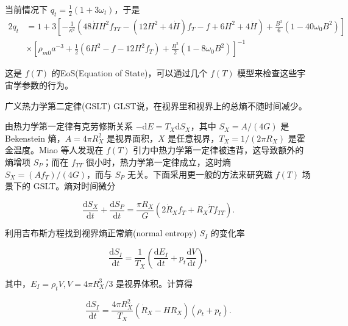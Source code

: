 \documentclass[9pt, dvipsnames]{beamer} %
\begin{document}
\begin{frame}
    当前情况下 $q_t=\frac{1}{2}(1+3\omega_t)$，于是
    $$
    \begin{aligned}
        2q_t
        &=1 + 3\left[-\frac{1 }{\kappa^2 } \left(48\dot{H} H^2 f_{TT} - \left(12 H^2 + 4\dot{H} \right) f_T - f + 6H^2 + 4\dot{H} \right) + \frac{B^2 }{6 } \left(1-40\omega_0 B^2 \right) \right] \\
        &\times \left[\rho_{m0}a^{-3} + \frac{1 }{2 } \left(6H^2-f-12H^2 f_T \right) + \frac{B^2 }{2 } \left(1-8\omega_0 B^2 \right) \right]^{-1}
    \end{aligned}
    $$

    这是 $f(T)$ 的EoS(Equation of State)，可以通过几个 $f(T)$ 模型来检查这些宇宙学参数的行为。
\end{frame}

\begin{frame}{广义热力学第二定律(GSLT)}
    GLST说，在视界里和视界上的总熵不随时间减少。

    由热力学第一定律有克劳修斯关系 $-\mathrm{d}E=T_X\mathrm{d}S_X$，其中 $S_X=A/(4G)$ 是 Bekenstein 熵，$A=4\pi R_X^2$ 是视界面积，$X$ 是任意视界，$T_X=1/(2\pi R_X)$ 是霍金温度。Miao 等人发现在 $f(T)$ 引力中热力学第一定律被违背，这导致额外的熵增项 $S_P$；而在 $f_{TT}$ 很小时，热力学第一定律成立，这时熵 $S_X=(Af_T)/(4G)$，而与 $S_P$ 无关。下面采用更一般的方法来研究磁 $f(T)$ 场景下的 GSLT。熵对时间微分

    $$
    \frac{\mathrm{d}S_X }{\mathrm{d}t } + \frac{\mathrm{d}S_P }{\mathrm{d}t } = \frac{\pi R_X }{G } \left(2\dot{R}_X f_T + R_X\dot{T} f_{TT} \right).
    $$

    利用吉布斯方程找到视界熵正常熵(normal entropy) $S_I$ 的变化率

    $$
    \frac{\mathrm{d}S_I }{\mathrm{d}t } 
    =\frac{1 }{T_X } \left(\frac{\mathrm{d}E_I }{\mathrm{d}t } + p_t\frac{\mathrm{d}V }{\mathrm{d}t }  \right),
    $$

    其中，$E_I=\rho_t V,V=4\pi R_X^3/3$ 是视界体积。计算得

    $$
    \frac{\mathrm{d}S_I }{\mathrm{d}t } 
    =\frac{4\pi R_X^2 }{T_X } \left(\dot{R}_X - H R_X \right)\left(\rho_t+p_t \right).
    $$
    
\end{frame}
\end{document}
